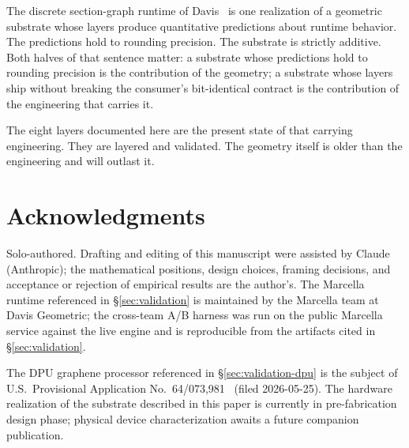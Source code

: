 \documentclass[11pt,letterpaper]{article}
\begin{document}
The discrete section-graph runtime of
Davis~\cite{davis2026sheafcomposition} is one realization of a
geometric substrate whose layers produce quantitative predictions
about runtime behavior. The predictions hold to rounding precision.
The substrate is strictly additive. Both halves of that sentence
matter: a substrate whose predictions hold to rounding precision is
the contribution of the geometry; a substrate whose layers ship
without breaking the consumer's bit-identical contract is the
contribution of the engineering that carries it.

The eight layers documented here are the present state of that
carrying engineering. They are layered and validated. The geometry
itself is older than the engineering and will outlast it.


\section*{Acknowledgments}

Solo-authored. Drafting and editing of this manuscript were
assisted by Claude (Anthropic); the mathematical positions, design
choices, framing decisions, and acceptance or rejection of
empirical results are the author's. The Marcella runtime
referenced in \S\ref{sec:validation} is maintained by the Marcella
team at Davis Geometric; the cross-team A/B harness was run on the
public Marcella service against the live engine and is reproducible
from the artifacts cited in \S\ref{sec:validation}.

The DPU graphene processor referenced in
\S\ref{sec:validation-dpu} is the subject of U.S.\ Provisional
Application No.~64/073,981~\cite{davis2026dpu} (filed 2026-05-25).
The hardware realization of the substrate described in this paper is
currently in pre-fabrication design phase; physical device
characterization awaits a future companion publication.
\end{document}
